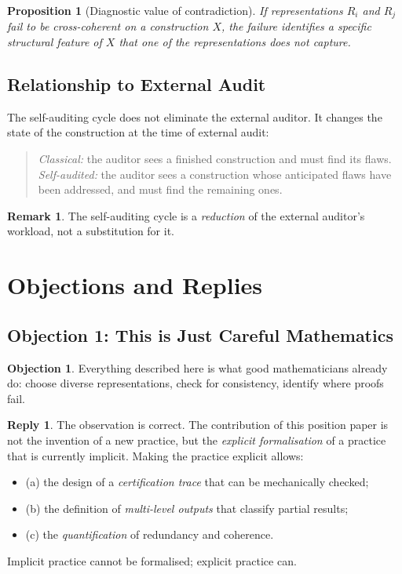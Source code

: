\documentclass[11pt,a4paper]{article}
\theoremstyle{definition}
\newtheorem{remark}[definition]{Remark}
\newtheorem{objection}[definition]{Objection}
\newtheorem{reply}[definition]{Reply}
\theoremstyle{plain}
\newtheorem{proposition}[definition]{Proposition}
\begin{document}
\begin{proposition}[Diagnostic value of contradiction]\label{pr:diagnostic}
If representations $R_i$ and $R_j$ fail to be cross-coherent on a
construction $X$, the failure identifies a specific structural
feature of $X$ that one of the representations does not capture.
\end{proposition}

\subsection{Relationship to External Audit}

The self-auditing cycle does not eliminate the external auditor.
It changes the state of the construction at the time of external
audit:

\begin{quote}
\emph{Classical:} the auditor sees a finished construction and
must find its flaws.\\[2mm]
\emph{Self-audited:} the auditor sees a construction whose
anticipated flaws have been addressed, and must find the
remaining ones.
\end{quote}

\begin{remark}
The self-auditing cycle is a \emph{reduction} of the external
auditor's workload, not a substitution for it.
\end{remark}

\section{Objections and Replies}
\label{sec:objections}

\subsection{Objection 1: This is Just Careful Mathematics}

\begin{objection}
Everything described here is what good mathematicians already do:
choose diverse representations, check for consistency, identify
where proofs fail.
\end{objection}

\begin{reply}
The observation is correct. The contribution of this position paper
is not the invention of a new practice, but the \emph{explicit
formalisation} of a practice that is currently implicit. Making the
practice explicit allows:
\begin{itemize}
  \item (a) the design of a \emph{certification trace} that can be
        mechanically checked;
  \item (b) the definition of \emph{multi-level outputs} that
        classify partial results;
  \item (c) the \emph{quantification} of redundancy and coherence.
\end{itemize}
Implicit practice cannot be formalised; explicit practice can.
\end{reply}
\end{document}
